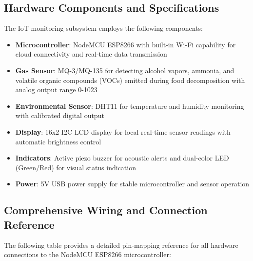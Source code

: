 \subsection{Hardware Components and Specifications}
The IoT monitoring subsystem employs the following components:
\begin{itemize}
    \item \textbf{Microcontroller}: NodeMCU ESP8266 with built-in Wi-Fi capability for cloud connectivity and real-time data transmission
    \item \textbf{Gas Sensor}: MQ-3/MQ-135 for detecting alcohol vapors, ammonia, and volatile organic compounds (VOCs) emitted during food decomposition with analog output range 0-1023
    \item \textbf{Environmental Sensor}: DHT11 for temperature and humidity monitoring with calibrated digital output
    \item \textbf{Display}: 16x2 I2C LCD display for local real-time sensor readings with automatic brightness control
    \item \textbf{Indicators}: Active piezo buzzer for acoustic alerts and dual-color LED (Green/Red) for visual status indication
    \item \textbf{Power}: 5V USB power supply for stable microcontroller and sensor operation
\end{itemize}

\subsection{Comprehensive Wiring and Connection Reference}
The following table provides a detailed pin-mapping reference for all hardware connections to the NodeMCU ESP8266 microcontroller:

